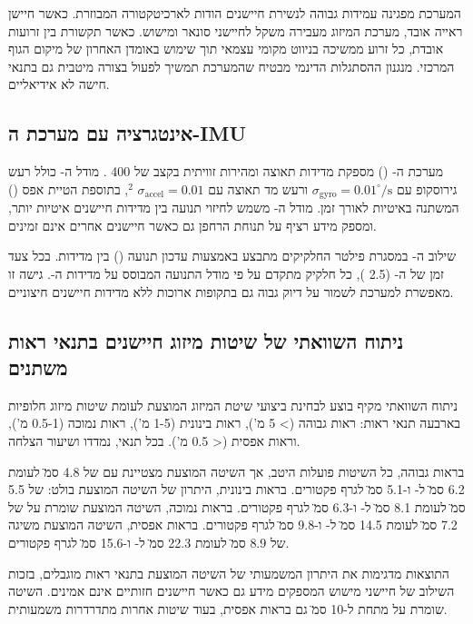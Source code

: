 המערכת מפגינה עמידות גבוהה לנשירת חיישנים הודות לארכיטקטורה המבוזרת. כאשר חיישן ראייה אובד, מערכת המיזוג מעבירה משקל לחיישני סונאר ומישוש. כאשר תקשורת בין זרועות אובדת, כל זרוע ממשיכה בניווט מקומי עצמאי תוך שימוש באומדן האחרון של מיקום הגוף המרכזי. מנגנון ההסתגלות הדינמי מבטיח שהמערכת תמשיך לפעול בצורה מיטבית גם בתנאי חישה לא אידיאליים.

\subsection{אינטגרציה עם מערכת ה-IMU}
\label{sec:ch05_imu}

מערכת ה- () מספקת מדידות תאוצה ומהירות זוויתית בקצב של 400 . מודל ה- כולל רעש גירוסקופ עם $\sigma_{\text{gyro}} = 0.01^\circ/\text{s}$ ורעש מד תאוצה עם $\sigma_{\text{accel}} = 0.01$ $^2$, בתוספת הטיית אפס () המשתנה באיטיות לאורך זמן. מודל ה- משמש לחיזוי תנועה בין מדידות חיישנים איטיות יותר, ומספק מידע רציף על תנוחת הרחפן גם כאשר חיישנים אחרים אינם זמינים.

שילוב ה- במסגרת פילטר החלקיקים מתבצע באמצעות עדכון תנועה () בין מדידות. בכל צעד זמן של ה- (2.5 ), כל חלקיק מתקדם על פי מודל התנועה המבוסס על מדידות ה-. גישה זו מאפשרת למערכת לשמור על דיוק גבוה גם בתקופות ארוכות ללא מדידות חיישנים חיצוניים.

\subsection{ניתוח השוואתי של שיטות מיזוג חיישנים בתנאי ראות משתנים}
\label{sec:ch05_comparative_analysis}

ניתוח השוואתי מקיף בוצע לבחינת ביצועי שיטת המיזוג המוצעת לעומת שיטות מיזוג חלופיות בארבעה תנאי ראות: ראות גבוהה (> 5 מ'), ראות בינונית (1-5 מ'), ראות נמוכה (0.5-1 מ'), וראות אפסית (< 0.5 מ'). בכל תנאי, נמדדו  ושיעור הצלחה.

בראות גבוהה, כל השיטות פועלות היטב, אך השיטה המוצעת מצטיינת עם  של 4.8 ס\"מ לעומת 6.2 ס\"מ ל- ו-5.1 ס\"מ לגרף פקטורים. בראות בינונית, היתרון של השיטה המוצעת בולט:  של 5.5 ס\"מ לעומת 8.1 ס\"מ ל- ו-6.3 ס\"מ לגרף פקטורים. בראות נמוכה, השיטה המוצעת שומרת על  של 7.2 ס\"מ לעומת 14.5 ס\"מ ל- ו-9.8 ס\"מ לגרף פקטורים. בראות אפסית, השיטה המוצעת משיגה  של 8.9 ס\"מ לעומת 22.3 ס\"מ ל- ו-15.6 ס\"מ לגרף פקטורים.

התוצאות מדגימות את היתרון המשמעותי של השיטה המוצעת בתנאי ראות מוגבלים, בזכות השילוב של חיישני מישוש המספקים מידע גם כאשר חיישנים חזותיים אינם אמינים. השיטה שומרת על  מתחת ל-10 ס\"מ גם בראות אפסית, בעוד שיטות אחרות מתדרדרות משמעותית.

